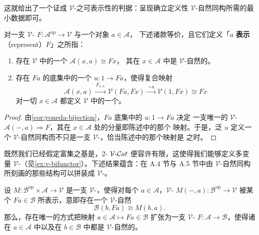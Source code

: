 这就给出了一个证成 $\mathcal{V}$-\trFunctor{}之可表示性的判据：呈现确立定义性
$\mathcal{V}$-自然同构所需的最小数据即可。

\begin{corollary}\label{cor:represent-functor}
对一支 $\mathcal{V}$-\trFunctor{}
$F\colon\mathcal{A}^{\mathrm{op}}\to\mathcal{V}$ 与一个对象 $a\in\mathcal{A}$，
下述诸款等价，且它们定义「$a$ \textbf{表示}（represent）$F$」之所指：
\begin{enumerate}[label=(\roman*)]
\item 存在 $\mathcal{V}$ 中的一个\trIsomorphism{} $\mathcal{A}(x,a)\cong Fx$，
  其在 $x\in\mathcal{A}$ 中是 $\mathcal{V}$-自然的。
\item 存在 $Fa$ 的底集中的一个\trElement{} $u\colon 1\to Fa$，使得复合映射
\[ \mathcal{A}(x,a)\xrightarrow{\ F_{x,a}\ }\mathcal{V}(Fa,Fx)
   \xrightarrow{\ \circ u\ }\mathcal{V}(1,Fx)\cong Fx \]
  对一切 $x\in\mathcal{A}$ 都定义 $\mathcal{V}$ 中的一个\trIsomorphism。
\end{enumerate}
\end{corollary}

\begin{proof}
由\cref{cor:yoneda-bijection}，$Fa$ 底集中的\trElement{} $u\colon 1\to Fa$ 决定
一支唯一的 $\mathcal{V}$-\trNaturalTransformation{}
$\mathcal{A}(-,a)\Rightarrow F$，其在 $x\in\mathcal{A}$ 处的分量即陈述中的那个
映射。于是，泛\trElement{} $u$ 定义一个 $\mathcal{V}$-自然同构而不只是一支
$\mathcal{V}$-\trNaturalTransformation，恰当陈述中的那个映射是\trIsomorphism{}%
之时。
\end{proof}

既然我们已经假定富集之基是\trCartesianClosed，2-\trCategory{}
$\mathcal{V}\text{-}\mathcal{C}at$ 便容许有限\trProduct，这使得我们能够定义多变量
$\mathcal{V}$-\trFunctor（见\cref{ex:v-bifunctor}）。下述结果蕴含：在 A.4 节与 A.5 节中由
$\mathcal{V}$-自然同构所刻画的那些结构可以拼装成 $\mathcal{V}$-\trFunctor。

\begin{proposition}\label{prop:unique-extension-vfunctor}
设 $M\colon\mathcal{B}^{\mathrm{op}}\times\mathcal{A}\to\mathcal{V}$ 是一支
$\mathcal{V}$-\trFunctor，使得对每个 $a\in\mathcal{A}$，$\mathcal{V}$-%
\trFunctor{} $M(-,a)\colon\mathcal{B}^{\mathrm{op}}\to\mathcal{V}$ 被某个
$Fa\in\mathcal{B}$ 所表示，意即存在一个 $\mathcal{V}$-自然\trIsomorphism
\[ \mathcal{B}(b,Fa)\cong M(b,a). \]
那么，存在唯一的方式把映射 $a\in\mathcal{A}\mapsto Fa\in\mathcal{B}$ 扩张为一支
$\mathcal{V}$-\trFunctor{} $F\colon\mathcal{A}\to\mathcal{B}$，使得诸%
\trIsomorphism{}在 $a\in\mathcal{A}$ 中以及在 $b\in\mathcal{B}$ 中都是
$\mathcal{V}$-自然的。
\end{proposition}


